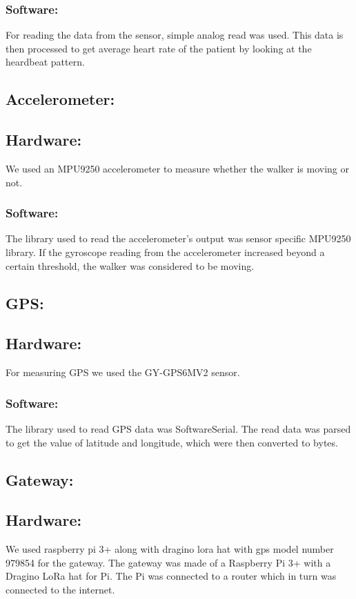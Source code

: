\subsubsection{Software:}
For reading the data from the sensor, simple analog read was used. This data is then processed to get average heart rate of the patient by looking at the heardbeat pattern.

\subsection{Accelerometer:}

\subsection{Hardware:}
We used an MPU9250 accelerometer to measure whether the walker is moving or not.

\subsubsection{Software:}
The library used to read the accelerometer's output was sensor specific MPU9250 library. If the gyroscope reading from the accelerometer increased beyond a certain threshold, the walker was considered to be moving.

\subsection{GPS:}

\subsection{Hardware:}
For measuring GPS we used the GY-GPS6MV2 sensor.

\subsubsection{Software:}
The library used to read GPS data was SoftwareSerial. The read data was parsed to get the value of latitude and longitude, which were then converted to bytes.

\subsection{Gateway:}

\subsection{Hardware:}
We used raspberry pi 3+ along with dragino lora hat with gps model number 979854 for the gateway.
The gateway was made of a Raspberry Pi 3+ with a Dragino LoRa hat for Pi. The Pi was connected to a router which in turn was connected to the internet.


